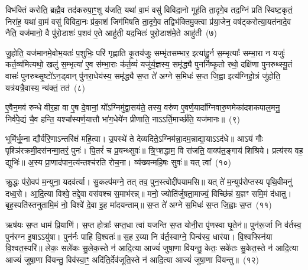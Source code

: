 विभ॑क्तिं करोति॒ ब्रह्मै॒व तद॑करुपा॒ꣳ॒शु य॑जति॒ यथा॑ वा॒मं वसु॑ विविदा॒नो गूह॑ति ता॒दृगे॒व तद॒ग्निं प्रति॑ स्विष्ट॒कृतं॒ निरा॑ह॒ यथा॑ वा॒मं वसु॑ विविदा॒नः प्र॑का॒शं जिग॑मिषति ता॒दृगे॒व तद्विभ॑क्तिमु॒क्त्वा प्र॑या॒जेन॒ वष॑ट्करोत्या॒यत॑नादे॒व नैति॒ यज॑मानो॒ वै पु॑रो॒डाशः॑ प॒शव॑ ए॒ते आहु॑ती॒ यद॒भितः॑ पुरो॒डाश॑मे॒ते आहु॑ती~(७)

जु॒होति॒ यज॑मानमे॒वोभ॒यतः॑ प॒शुभिः॒ परि॑ गृह्णाति कृ॒तय॑जुः॒ सम्भृ॑तसम्भार॒ इत्या॑हु॒र्न स॒म्भृत्याः᳚ सम्भा॒रा न यजुः॑ कर्त॒व्य॑मित्यथो॒ खलु॑ स॒म्भृत्या॑ ए॒व स॑म्भा॒राः क॑र्त॒व्यं॑ यजु॑र्य॒ज्ञस्य॒ समृ॑द्ध्यै पुनर्निष्कृ॒तो रथो॒ दक्षि॑णा पुनरुथ्स्यू॒तं वासः॑ पुनरुथ्सृ॒ष्टो॑\-ऽन॒ड्वान् पु॑नरा॒धेय॑स्य॒ समृ॑द्ध्यै स॒प्त ते॑ अग्ने स॒मिधः॑ स॒प्त जि॒ह्वा इत्य॑ग्निहो॒त्रं जु॑होति॒ यत्र॑यत्रै॒वास्य॒ न्य॑क्तं॒ तत॑~(८)

ए॒वैन॒मव॑ रुन्धे वीर॒हा वा ए॒ष दे॒वानां॒ यो᳚\-ऽग्निमु॑द्वा॒सय॑ते॒ तस्य॒ वरु॑ण ए॒वर्ण॒यादा᳚ग्निवारु॒णमेका॑\-दश\-कपाल॒मनु॒ निर्व॑पे॒द्यं चै॒व हन्ति॒ यश्चा᳚स्यर्ण॒यात्तौ भा॑ग॒धेये॑न प्रीणाति॒ ना\-ऽऽ\-र्ति॒मार्च्छ॑ति॒ यज॑मानः॥~(९)

{\anuvakamend[{आ\-ऽप॑राभावाय पुरो॒डाश॑मे॒ते आहु॑ती॒ ततः॒ षट्त्रिꣳ॑शच्च}]}%

भूमि॑र्भू॒म्ना द्यौर्व॑रि॒णा\-ऽन्तरि॑क्षं महि॒त्वा। उ॒पस्थे॑ ते देव्यदिते॒\-ऽग्निम॑न्ना॒दम॒न्नाद्या॒या\-ऽऽ\-द॑धे॥ आ\-ऽयं गौः पृश्ञि॑रक्रमी॒दस॑नन्मा॒तरं॒ पुनः॑। पि॒तरं॑ च प्र॒यन्थ्सुवः॑॥ त्रि॒ꣳ॒शद्धाम॒ वि रा॑जति॒ वाक्प॑त॒ङ्गाय॑ शिश्रिये। प्रत्य॑स्य वह॒ द्युभिः॑॥ अ॒स्य प्रा॒णाद॑पान॒त्य॑न्तश्च॑रति रोच॒ना। व्य॑ख्यन्महि॒षः सुवः॑॥ यत् त्वा᳚~(१०)

क्रु॒द्धः प॑रो॒वप॑ म॒न्युना॒ यदव॑र्त्या। सु॒कल्प॑मग्ने॒ तत् तव॒ पुन॒स्त्वोद्दी॑पयामसि॥ यत् ते॑ म॒न्युप॑रोप्तस्य पृथि॒वीमनु॑ दध्व॒से। आ॒दि॒त्या विश्वे॒ तद्दे॒वा वस॑वश्च स॒माभ॑रन्न्॥ मनो॒ ज्योति॑र्जुषता॒माज्यं॒ विच्छि॑न्नं य॒ज्ञꣳ समि॒मं द॑धातु। बृह॒स्पति॑स्तनुतामि॒मं नो॒ विश्वे॑ दे॒वा इ॒ह मा॑दयन्ताम्॥ स॒प्त ते॑ अग्ने स॒मिधः॑ स॒प्त जि॒ह्वाः स॒प्त~(११)

ऋष॑यः स॒प्त धाम॑ प्रि॒याणि॑। स॒प्त होत्राः᳚ सप्त॒धा त्वा॑ यजन्ति स॒प्त योनी॒रा पृ॑णस्वा घृ॒तेन॑॥ पुन॑रू॒र्जा नि व॑र्तस्व॒ पुन॑रग्न इ॒षा\-ऽऽ\-यु॑षा। पुन॑र्नः पाहि वि॒श्वतः॑॥ स॒ह र॒य्या नि व॑र्त॒स्वाग्ने॒ पिन्व॑स्व॒ धार॑या। वि॒श्वफ्स्नि॑या वि॒श्वत॒स्परि॑॥ लेकः॒ सले॑कः सु॒लेक॒स्ते न॑ आदि॒त्या आज्यं॑ जुषा॒णा वि॑यन्तु॒ केतः॒ सके॑तः सु॒केत॒स्ते न॑ आदि॒त्या आज्यं॑ जुषा॒णा वि॑यन्तु॒ विव॑स्वा॒ꣳ॒ अदि॑ति॒र्देव॑जूति॒स्ते न॑ आदि॒त्या आज्यं॑ जुषा॒णा वि॑यन्तु॥~(१२)

{\anuvakamend[{त्वा॒ जि॒ह्वाः स॒प्त सु॒केत॒स्ते न॒स्त्रयो॑दश च}]}%

